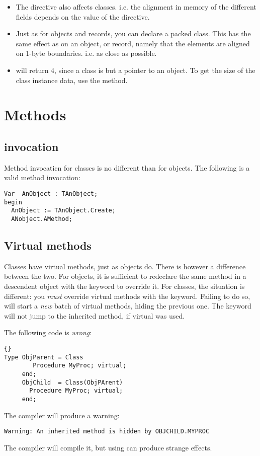 \documentclass{report}
\begin{document}
\begin{remark}
\begin{itemize}
\item The  directive also affects classes.
i.e. the alignment in memory of the different fields depends on the
value of  the  directive.
\item Just as for objects and records, you can declare a packed class.
This has the same effect as on an object, or record, namely that the
elements are aligned on 1-byte boundaries. i.e. as close as possible.
\item {} will return 4, since a class is but a pointer to
an object. To get the size of the class instance data, use the
 method.
\end{itemize}
\end{remark}

\section{Methods}
\subsection{invocation}
Method invocaticn for classes is no different than for objects. The
following is a valid method invocation:
\begin{verbatim}
Var  AnObject : TAnObject;
begin
  AnObject := TAnObject.Create;
  ANobject.AMethod;
\end{verbatim}
\subsection{Virtual methods}
Classes have virtual methods, just as objects do. There is however a
difference between the two. For objects, it is sufficient to redeclare the
same method in a descendent object with the keyword  to
override it. For classes, the situation is different: you {\em must}
override virtual methods with the  keyword. Failing to do so,
will start a {\em new} batch of virtual methods, hiding the previous
one.  The  keyword will not jump to the inherited method, if
virtual was used. 

The following code is {\em wrong}:
\begin{lstlisting}{}
Type ObjParent = Class
        Procedure MyProc; virtual;
     end;
     ObjChild  = Class(ObjPArent)
       Procedure MyProc; virtual;
     end;
\end{lstlisting}{}     
The compiler will produce a warning:
\begin{verbatim}
Warning: An inherited method is hidden by OBJCHILD.MYPROC
\end{verbatim}
The compiler will compile it, but using  can
produce strange effects.
\end{document}
